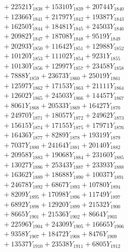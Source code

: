 \documentclass[a4paper,10pt]{article}
\begin{document}
{\begin{align}
&\;  + 22521 Y_{1838} + 15310 Y_{1839} + 20744 Y_{1840} \\[0.3ex]
&\;  + 12366 Y_{1841} + 21797 Y_{1842} + 19387 Y_{1843} \\[0.3ex]
&\;  + 16250 Y_{1844} + 18481 Y_{1845} + 24503 Y_{1846} \\[0.3ex]
&\;  + 20982 Y_{1847} + 18708 Y_{1848} + 9519 Y_{1849} \\[0.3ex]
&\;  + 20293 Y_{1850} + 11642 Y_{1851} + 12988 Y_{1852} \\[0.3ex]
&\;  + 10120 Y_{1853} + 11102 Y_{1854} + 9231 Y_{1855} \\[0.3ex]
&\;  + 10130 Y_{1856} + 12997 Y_{1857} + 23458 Y_{1858} \\[0.5ex]\allowbreak
&\;  + 7888 Y_{1859} + 23673 Y_{1860} + 25019 Y_{1861} \\[0.3ex]
&\;  + 12597 Y_{1862} + 17153 Y_{1863} + 21111 Y_{1864} \\[0.3ex]
&\;  + 12602 Y_{1865} + 24503 Y_{1866} + 14457 Y_{1867} \\[0.3ex]
&\;  + 8061 Y_{1868} + 20533 Y_{1869} + 16427 Y_{1870} \\[0.3ex]
&\;  + 24970 Y_{1871} + 18057 Y_{1872} + 24962 Y_{1873} \\[0.3ex]
&\;  + 15615 Y_{1874} + 17155 Y_{1875} + 17971 Y_{1876} \\[0.3ex]
&\;  + 16436 Y_{1877} + 8289 Y_{1878} + 19319 Y_{1879} \\[0.3ex]
&\;  + 7037 Y_{1880} + 24164 Y_{1881} + 20140 Y_{1882} \\[0.3ex]
&\;  + 20958 Y_{1883} + 19068 Y_{1884} + 23160 Y_{1885} \\[0.3ex]
&\;  + 13027 Y_{1886} + 25343 Y_{1887} + 23393 Y_{1888} \\[0.5ex]\allowbreak
&\;  + 16362 Y_{1889} + 18688 Y_{1890} + 10037 Y_{1891} \\[0.3ex]
&\;  + 24678 Y_{1892} + 6867 Y_{1893} + 10780 Y_{1894} \\[0.3ex]
&\;  + 8209 Y_{1895} + 17098 Y_{1896} + 11749 Y_{1897} \\[0.3ex]
&\;  + 6892 Y_{1898} + 12920 Y_{1899} + 21532 Y_{1900} \\[0.3ex]
&\;  + 8665 Y_{1901} + 21536 Y_{1902} + 8664 Y_{1903} \\[0.3ex]
&\;  + 22596 Y_{1904} + 24309 Y_{1905} + 16665 Y_{1906} \\[0.3ex]
&\;  + 9358 Y_{1907} + 18472 Y_{1908} + 8476 Y_{1909} \\[0.3ex]
&\;  + 13537 Y_{1910} + 23538 Y_{1911} + 6805 Y_{1912} \\[0.3ex]

\end{align}}
\end{document}

